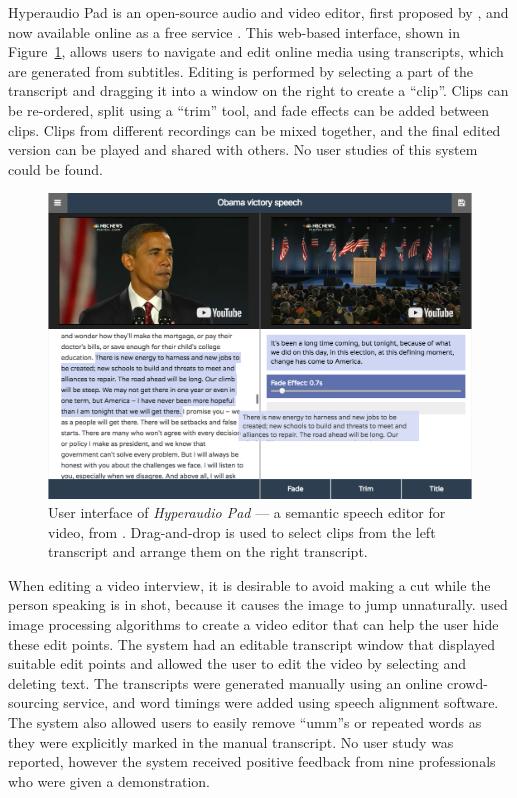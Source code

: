 Hyperaudio Pad is an open-source audio and video editor, first proposed by \citet{Boas2011}, and now available online
as a free service \citep{Hyperaudio2016}. This web-based interface, shown in Figure~\ref{fig:Boas2011}, allows users to
navigate and edit online media using transcripts, which are generated from subtitles.
Editing is performed by selecting a part of the transcript and dragging it into a window on the right to create a
``clip''. Clips can be re-ordered, split using a ``trim'' tool, and fade effects can be added between clips. Clips from
different recordings can be mixed together, and the final edited version can be played and shared with others. No user
studies of this system could be found.

\begin{figure}[h]
\centering
  \centering
  \includegraphics[width=.8\textwidth]{figs/hyperaudio-pad-example2.png}
  \caption[User interface of \textit{Hyperaudio Pad} --- a semantic speech editor for video, from
  \citet{Boas2011}.]{User interface of \textit{Hyperaudio Pad} --- a semantic speech editor for video, from
  \citet{Boas2011}.  Drag-and-drop is used to select clips from the left transcript and arrange them on the right
transcript.}
  \label{fig:Boas2011}
\end{figure}


When editing a video interview, it is desirable to avoid making a cut while the person speaking is in shot, because it
causes the image to jump unnaturally.  \citet{Berthouzoz2012} used image processing algorithms to create a video editor
that can help the user hide these edit points. The system had an editable transcript window that displayed suitable
edit points and allowed the user to edit the video by selecting and deleting text. The transcripts were generated
manually using an online crowd-sourcing service, and word timings were added using speech alignment software. The
system also allowed users to easily remove ``umm''s or repeated words as they were explicitly marked in the manual
transcript. No user study was reported, however the system received positive feedback from nine professionals who were
given a demonstration.

